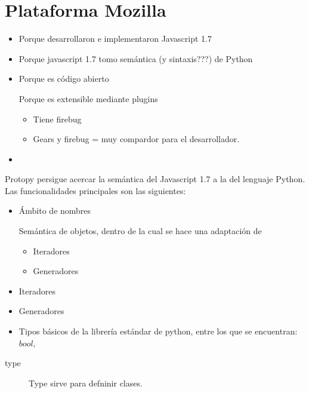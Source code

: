 \documentclass[a4paper]{report}
\begin{document}
\chapter{Plataforma Mozilla}
\begin{itemize}
  \item Porque desarrollaron e implementaron Javascript 1.7
  \item Porque javascript 1.7 tomo semántica (y sintaxis???) de Python
  \item Porque es código abierto
  \begin{item}
  	Porque es extensible mediante plugins
  	\begin{itemize}
        \item Tiene firebug
        \item Gears y firebug = muy compardor para el desarrollador.
     \end{itemize}
      
  \end{item}
  \item 
\end{itemize}

\label{ch:protopy}

Protopy persigue acercar la semántica del Javascript 1.7 a la del lenguaje
Python. Las funcionalidades principales son las siguientes:
\begin{itemize}
  \item Ámbito de nombres
  \begin{item}
  Semántica de objetos, dentro de la cual se hace una adaptación de
  \begin{itemize}
  	\item Iteradores
  	\item Generadores  
  \end{itemize}
  \end{item}
  
  
  \item Iteradores
  \item Generadores
  
  \item Tipos básicos de la librería estándar de python, entre los que se
  encuentran: $ bool, $
\end{itemize}


\begin{description}
\item[type]{
Type sirve para defninir clases.
}
\end{description}
\begin{thebibliography}{99}


\end{thebibliography}
\end{document}
